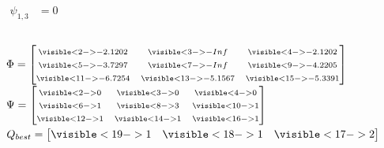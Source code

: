 \begin{frame}
\begin{columns}[T]
{    \vspace*{2em}
    \begin{equation*}
      \begin{split}
        \scriptstyle \psi_{1,3} & \scriptstyle  = 0
      \end{split}
    \end{equation*}
    }


  \end{columns}
  $\Phi=\begin{bmatrix}
       \scriptstyle \visible<2->{-2.1202} & \scriptstyle \visible<3->{-Inf} & \scriptstyle \visible<4->{-2.1202} \\
       \scriptstyle \visible<5->{-3.7297} & \scriptstyle \visible<7->{-Inf} & \scriptstyle \visible<9->{-4.2205} \\
       \scriptstyle \visible<11->{-6.7254} & \scriptstyle \visible<13->{-5.1567} & \scriptstyle \visible<15->{-5.3391}\end{bmatrix}$ $\Psi=\begin{bmatrix}
       \scriptstyle \visible<2->{0} & \scriptstyle \visible<3->{0} & \scriptstyle \visible<4->{0} \\
       \scriptstyle \visible<6->{1} & \scriptstyle \visible<8->{3} & \scriptstyle \visible<10->{1} \\
       \scriptstyle \visible<12->{1} & \scriptstyle \visible<14->{1} & \scriptstyle \visible<16->{1}\end{bmatrix}$ $Q_{best} = \begin{bmatrix}\visible<19->{1} & \visible<18->{1} & \visible<17->{2}\end{bmatrix}$
     
\end{frame}

